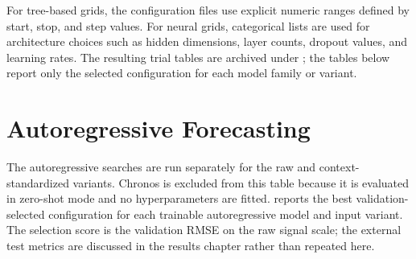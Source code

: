 For tree-based grids, the configuration files use explicit numeric ranges
defined by start, stop, and step values. For neural grids, categorical lists are
used for architecture choices such as hidden dimensions, layer counts, dropout
values, and learning rates. The resulting trial tables are archived under
; the tables below report only the selected
configuration for each model family or variant.

\section{Autoregressive Forecasting}

The autoregressive searches are run separately for the raw and
context-standardized variants. Chronos is excluded from this table because it
is evaluated in zero-shot mode and no hyperparameters are fitted.
 reports the best validation-selected
configuration for each trainable autoregressive model and input variant. The
selection score is the validation RMSE on the raw signal scale; the external
test metrics are discussed in the results chapter rather than repeated here.

